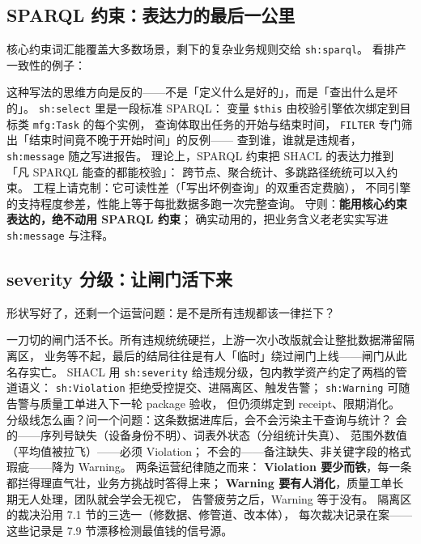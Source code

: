 \subsection{SPARQL 约束：表达力的最后一公里}

核心约束词汇能覆盖大多数场景，剩下的复杂业务规则交给 \texttt{sh:sparql}。
看排产一致性的例子：



这种写法的思维方向是反的——不是「定义什么是好的」，而是「查出什么是坏的」。
\texttt{sh:select} 里是一段标准 SPARQL：
变量 \texttt{\$this} 由校验引擎依次绑定到目标类 \texttt{mfg:Task} 的每个实例，
查询体取出任务的开始与结束时间，
\texttt{FILTER} 专门筛出「结束时间竟不晚于开始时间」的反例——
查到谁，谁就是违规者，\texttt{sh:message} 随之写进报告。
理论上，SPARQL 约束把 SHACL 的表达力推到「凡 SPARQL 能查的都能校验」：
跨节点、聚合统计、多跳路径统统可以入约束。
工程上请克制：它可读性差（「写出坏例查询」的双重否定费脑），
不同引擎的支持程度参差，性能上等于每批数据多跑一次完整查询。
守则：\textbf{能用核心约束表达的，绝不动用 SPARQL 约束}；
确实动用的，把业务含义老老实实写进 \texttt{sh:message} 与注释。

\subsection{severity 分级：让闸门活下来}

形状写好了，还剩一个运营问题：是不是所有违规都该一律拦下？



一刀切的闸门活不长。所有违规统统硬拦，上游一次小改版就会让整批数据滞留隔离区，
业务等不起，最后的结局往往是有人「临时」绕过闸门上线——闸门从此名存实亡。
SHACL 用 \texttt{sh:severity} 给违规分级，包内教学资产约定了两档的管道语义：
\texttt{sh:Violation} 拒绝受控提交、进隔离区、触发告警；
\texttt{sh:Warning} 可随告警与质量工单进入下一轮 package 验收，
但仍须绑定到 receipt、限期消化。
分级线怎么画？问一个问题：这条数据进库后，会不会污染主干查询与统计？
会的——序列号缺失（设备身份不明）、词表外状态（分组统计失真）、
范围外数值（平均值被拉飞）——必须 Violation；
不会的——备注缺失、非关键字段的格式瑕疵——降为 Warning。
两条运营纪律随之而来：
\textbf{Violation 要少而铁}，每一条都拦得理直气壮，业务方挑战时答得上来；
\textbf{Warning 要有人消化}，质量工单长期无人处理，团队就会学会无视它，
告警疲劳之后，Warning 等于没有。
隔离区的裁决沿用 7.1 节的三选一（修数据、修管道、改本体），
每次裁决记录在案——这些记录是 7.9 节漂移检测最值钱的信号源。

